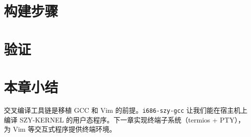 
\section{构建步骤}
\label{sec:cross-build}


\section{验证}
\label{sec:cross-verify}


\section{本章小结}

交叉编译工具链是移植 GCC 和 Vim 的前提。\texttt{i686-szy-gcc} 让我们能在宿主机上
编译 SZY-KERNEL 的用户态程序。下一章实现终端子系统（termios + PTY），
为 Vim 等交互式程序提供终端环境。
